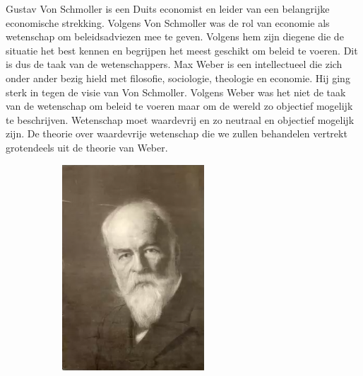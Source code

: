 \documentclass[../summary.tex]{subfiles}
\begin{document}
	Gustav Von Schmoller is een Duits economist en leider van een belangrijke economische strekking. Volgens Von Schmoller was de rol van economie als wetenschap om beleidsadviezen mee te geven. Volgens hem zijn diegene die de situatie het best kennen en begrijpen het meest geschikt om beleid te voeren. Dit is dus de taak van de wetenschappers. Max Weber is een intellectueel die zich onder ander bezig hield met filosofie, sociologie, theologie en economie. Hij ging sterk in tegen de visie van Von Schmoller. Volgens Weber was het niet de taak van de wetenschap om beleid te voeren maar om de wereld zo objectief mogelijk te beschrijven. Wetenschap moet waardevrij en zo neutraal en objectief mogelijk zijn. De theorie over waardevrije wetenschap die we zullen behandelen vertrekt grotendeels uit de theorie van Weber. 
	
	\begin{figure} [htbp]
		\centering
		\begin{subfigure}{0.3\linewidth}
			\centering
			\includegraphics[width=\linewidth]{images/2-von-schmoller.png}

\end{subfigure}
\end{figure}
\end{document}
